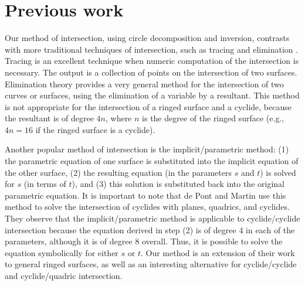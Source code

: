 %
%


% 

\section{Previous work}
\label{prev-wk}

Our method of intersection, using circle decomposition and inversion,
contrasts with more traditional techniques of intersection, such as
tracing and elimination \cite{HOF89}.
Tracing \cite{BHHL88} is an excellent technique 
when numeric computation of the intersection is necessary.
The output is a collection of points on the intersection 
of two surfaces.
Elimination theory provides a very general method for the intersection 
of two curves or surfaces, using the elimination of a variable by a 
resultant.
This method is not appropriate for the intersection of a ringed surface 
and a cyclide, because the resultant is of degree $4n$,
where $n$ is the degree of the ringed surface (e.g., $4n = 16$ if the ringed
surface is a cyclide).

Another popular method of intersection is the implicit/parametric method:
(1) the parametric equation of one surface is substituted into the implicit
equation of the other surface, (2) the resulting equation (in the
parameters $s$ and $t$) is solved for $s$ (in terms of $t$), 
and (3) this solution is substituted back into the original parametric 
equation.
It is important to note that de Pont and Martin \cite{DEP84,MDS86} use
this method to solve the intersection of cyclides with planes, quadrics,
and cyclides.
They observe that the implicit/parametric method is applicable to 
cyclide/cyclide intersection because the equation derived in step (2) 
is of degree 4 in each of the parameters, although it is of degree 8 overall.
Thus, it is possible to solve the equation symbolically for either $s$
or $t$.
Our method is an extension of their work to general ringed surfaces, as
well as an interesting alternative for cyclide/cyclide and cyclide/quadric
intersection.

